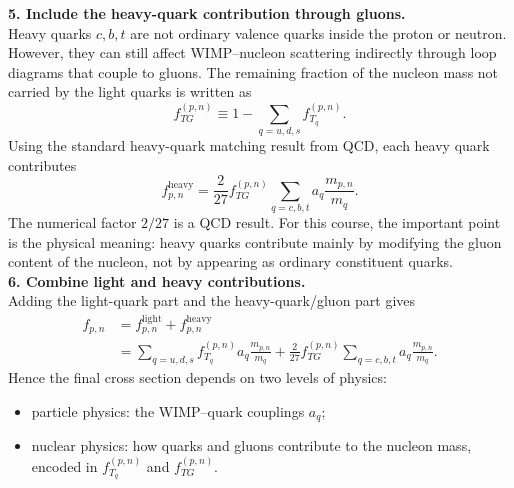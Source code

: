 \begin{foundation}
    \textbf{5. Include the heavy-quark contribution through gluons.}\\
    Heavy quarks $c,b,t$ are not ordinary valence quarks inside the proton or neutron. However, they can still affect WIMP--nucleon scattering indirectly through loop diagrams that couple to gluons. The remaining fraction of the nucleon mass not carried by the light quarks is written as
    \[
        f_{TG}^{(p,n)} \equiv 1-\sum_{q=u,d,s} f_{T_q}^{(p,n)} .
    \]
    Using the standard heavy-quark matching result from QCD, each heavy quark contributes
    \[
        f_{p,n}^{\mathrm{heavy}}
        = \frac{2}{27} f_{TG}^{(p,n)} \sum_{q=c,b,t} a_q \frac{m_{p,n}}{m_q} .
    \]
    The numerical factor $2/27$ is a QCD result. For this course, the important point is the physical meaning: heavy quarks contribute mainly by modifying the gluon content of the nucleon, not by appearing as ordinary constituent quarks. \\

    \textbf{6. Combine light and heavy contributions.}\\
    Adding the light-quark part and the heavy-quark/gluon part gives
    \begin{align*}
        f_{p,n}
        &= f_{p,n}^{\mathrm{light}} + f_{p,n}^{\mathrm{heavy}} \\
        &= \sum_{q=u,d,s} f_{T_q}^{(p,n)} a_q \frac{m_{p,n}}{m_q}
        + \frac{2}{27} f_{TG}^{(p,n)} \sum_{q=c,b,t} a_q \frac{m_{p,n}}{m_q} .
    \end{align*}
    Hence the final cross section depends on two levels of physics:
    \begin{itemize}
        \item particle physics: the WIMP--quark couplings $a_q$;
        \item nuclear physics: how quarks and gluons contribute to the nucleon mass, encoded in $f_{T_q}^{(p,n)}$ and $f_{TG}^{(p,n)}$.
    \end{itemize}



\end{foundation}

